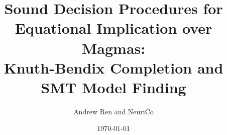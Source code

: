 \documentclass{amsart}
\title[Equational Implication over Magmas]{Sound Decision Procedures for
  Equational Implication over Magmas:\\
  Knuth-Bendix Completion and SMT Model Finding}
\author{Andrew Ren and NeuriCo}
\date{\today}
\theoremstyle{definition}
\theoremstyle{remark}
\numberwithin{equation}{section}
\begin{document}
\begin{abstract}

\end{abstract}

\maketitle

\tableofcontents











\end{document}
